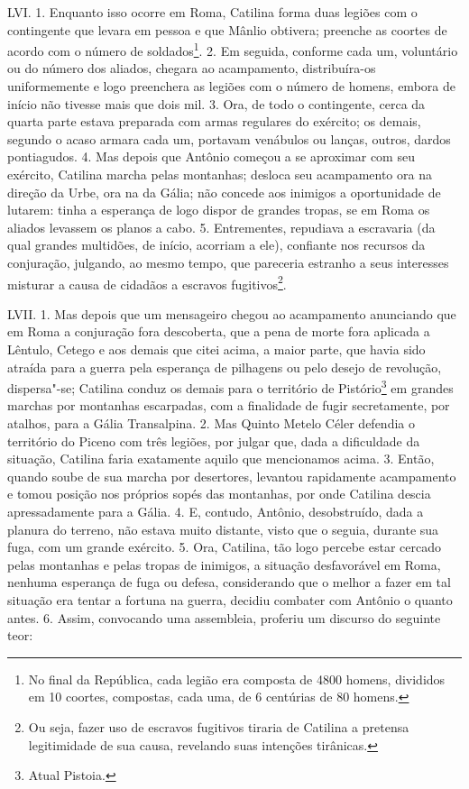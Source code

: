 LVI. 1. Enquanto isso ocorre em Roma, Catilina forma duas legiões com o
contingente que  levara em pessoa e que Mânlio obtivera; preenche as coortes de
acordo com o número de soldados\footnote{No final da República, cada legião era
composta de 4800 homens, divididos em 10 coortes, compostas, cada uma, de 6
centúrias de 80 homens.}. 2. Em seguida, conforme cada um, voluntário ou do
número dos aliados, chegara ao acampamento, distribuíra-os uniformemente e logo
preenchera as legiões com o número de homens, embora de início não tivesse mais
que dois mil. 3. Ora, de todo o contingente, cerca da quarta parte estava
preparada com armas regulares do exército; os demais, segundo o acaso armara
cada um, portavam venábulos ou lanças, outros, dardos pontiagudos. 4. Mas
depois que Antônio começou a se aproximar com seu exército, Catilina marcha
pelas montanhas; desloca seu acampamento ora na direção da Urbe, ora na da
Gália; não concede aos inimigos a oportunidade de lutarem: tinha a esperança de
logo dispor de grandes tropas, se em Roma os aliados levassem os planos a cabo.
5. Entrementes, repudiava a escravaria (da qual grandes multidões, de início,
acorriam a ele), confiante nos recursos da conjuração, julgando, ao mesmo
tempo, que pareceria estranho a seus interesses misturar a causa de cidadãos a
escravos fugitivos\footnote{Ou seja, fazer uso de escravos fugitivos tiraria de
Catilina a pretensa legitimidade de sua causa, revelando suas intenções
tirânicas.}.
 
LVII. 1. Mas depois que um mensageiro chegou ao acampamento anunciando que em
Roma a conjuração fora descoberta, que a pena de morte fora aplicada a Lêntulo,
Cetego e aos demais que  citei acima, a maior parte, que havia sido atraída para
a guerra pela esperança de pilhagens ou pelo desejo de revolução, dispersa"-se;
Catilina conduz os demais para o território de Pistório\footnote{Atual
Pistoia.} em grandes marchas por montanhas escarpadas, com a finalidade de
fugir secretamente, por atalhos, para a Gália Transalpina. 2. Mas Quinto Metelo
Céler defendia o território do Piceno com três legiões, por julgar que, dada a
dificuldade da situação, Catilina faria exatamente aquilo que mencionamos
acima. 3. Então, quando soube de sua marcha por desertores, levantou
rapidamente acampamento e tomou posição nos próprios sopés das montanhas, por
onde  Catilina descia apressadamente para a Gália. 4. E, contudo, Antônio,
desobstruído, dada a planura do terreno, não estava muito distante, visto que o
seguia, durante sua fuga, com um grande exército. 5. Ora, Catilina, tão logo percebe estar
cercado pelas montanhas e pelas tropas de inimigos, a situação desfavorável em
Roma, nenhuma esperança de fuga ou defesa, considerando que o melhor a fazer em
tal situação era tentar a fortuna na guerra, decidiu combater com Antônio o
quanto antes. 6. Assim, convocando uma assembleia, proferiu um discurso do
seguinte teor:

